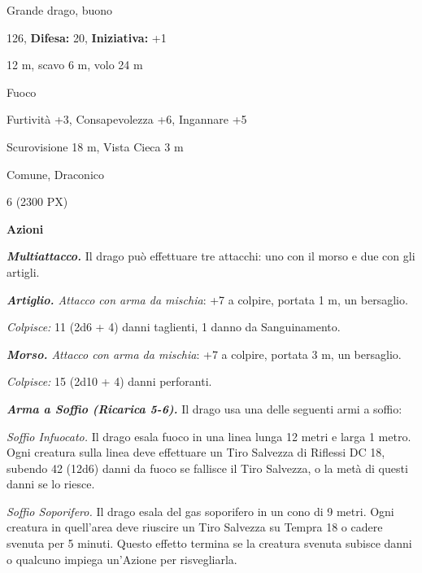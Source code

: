 \begin{multicols}{2}
{
\begin{description}[noitemsep, topsep=0pt, parsep=0pt, partopsep=0pt, leftmargin=0cm, labelwidth=2.2cm]
	\item[\textbf{Taglia/Tipo:}] Grande drago, buono
	\item[\textbf{Caratt.:}] 
	\item[\textbf{Punti Ferita:}] 126,  \textbf{Difesa:} 20,  \textbf{Iniziativa:} +1
	\item[\textbf{Movimento:}] 12 m, scavo 6 m, volo 24 m
	\item[\textbf{Tiri Salvez.:}] 
	\item[\textbf{Imm. Danni:}] Fuoco
	\item[\textbf{Comp.:}] Furtività +3, Consapevolezza +6, Ingannare +5
	\item[\textbf{Sensi:}] Scurovisione 18 m, Vista Cieca 3 m
	\item[\textbf{Linguaggi:}] Comune, Draconico
	\item[\textbf{Sfida:}] 6 (2300 PX)\smallskip
\end{description}

\textbf{Azioni}

\emph{\textbf{Multiattacco.}} Il drago può effettuare tre attacchi: uno con il morso e due con gli artigli.

\emph{\textbf{Artiglio.} Attacco con arma da mischia}: +7 a colpire, portata 1 m, un bersaglio.

\emph{Colpisce:} 11 (2d6 + 4) danni taglienti, 1 danno da Sanguinamento.

\emph{\textbf{Morso.} Attacco con arma da mischia}: +7 a colpire, portata 3 m, un bersaglio.

\emph{Colpisce:} 15 (2d10 + 4) danni perforanti.

\emph{\textbf{Arma a Soffio (Ricarica 5-6).}} Il drago usa una delle seguenti armi a soffio:

\emph{Soffio Infuocato.} Il drago esala fuoco in una linea lunga 12 metri e larga 1 metro. Ogni creatura sulla linea deve effettuare un Tiro Salvezza di Riflessi DC 18, subendo 42 (12d6) danni da fuoco se fallisce il Tiro Salvezza, o la metà di questi danni se lo riesce.

\emph{Soffio Soporifero.} Il drago esala del gas soporifero in un cono di 9 metri. Ogni creatura in quell'area deve riuscire un Tiro Salvezza su Tempra 18 o cadere svenuta per 5 minuti. Questo effetto termina se la creatura svenuta subisce danni o qualcuno impiega un'Azione per risvegliarla.

}
\end{multicols}
